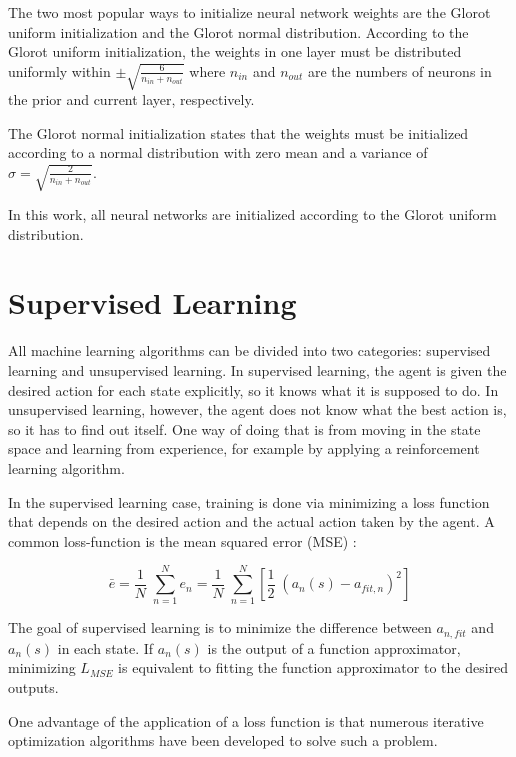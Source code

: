 The two most popular ways to initialize neural network weights are the Glorot uniform initialization and the Glorot normal distribution. According to the Glorot uniform initialization, the weights in one layer must be distributed uniformly within $\pm \sqrt{\frac{6}{n_{in}+n_{out}}}$ where $n_{in}$ and $n_{out}$ are the numbers of neurons in the prior and current layer, respectively.

The Glorot normal initialization states that the weights must be initialized according to a normal distribution with zero mean and a variance of $\sigma = \sqrt{\frac{2}{n_{in}+n_{out}}}$.

In this work, all neural networks are initialized according to the Glorot uniform distribution. 

\section{Supervised Learning}
All machine learning algorithms can be divided into two categories: supervised learning and unsupervised learning. In supervised learning, the agent is given the desired action for each state explicitly, so it knows what it is supposed to do. In unsupervised learning, however, the agent does not know what the best action is, so it has to find out itself. One way of doing that is from moving in the state space and learning from experience, for example by applying a reinforcement learning algorithm.

In the supervised learning case, training is done via minimizing a loss function that depends on the desired action and the actual action taken by the agent. A common loss-function is the mean squared error (MSE) :

\begin{equation}
\bar{e} = \frac{1}{N}\;\sum_{n=1}^{N}{e}_{n} =  \frac{1}{N}\;\sum_{n=1}^{N}[\frac{1}{2}\;(a_n(s)-a_{fit,n})^2]
\label{lossfun}
\end{equation}

The goal of supervised learning is to minimize the difference between $a_{n,fit}$ and $a_n(s)$ in each state. If $a_n(s)$ is the output of a function approximator, minimizing $L_{MSE}$ is equivalent to fitting the function approximator to the desired outputs.

One advantage of the application of a loss function is that numerous iterative optimization algorithms have been developed to solve such a problem.

